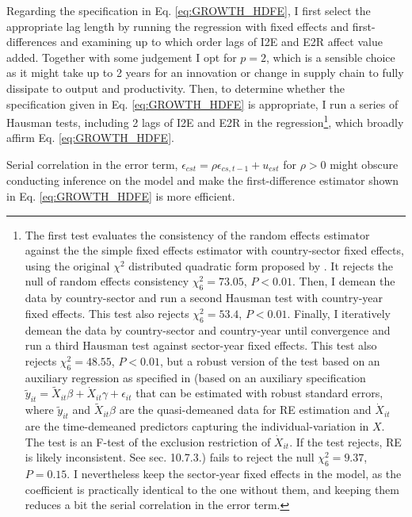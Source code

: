 \documentclass[a4paper]{article}
\begin{document}
Regarding the specification in Eq. \ref{eq:GROWTH_HDFE}, I first select the appropriate lag length by running the regression with fixed effects and first-differences and examining up to which order lags of I2E and E2R affect value added. Together with some judgement I opt for $p = 2$, which is a sensible choice as it might take up to 2 years for an innovation or change in supply chain to fully dissipate to output and productivity. Then, to determine whether the specification given in Eq. \ref{eq:GROWTH_HDFE} is appropriate, I run a series of Hausman tests, including 2 lags of I2E and E2R in the regression\footnote{The first test evaluates the consistency of the random effects estimator against the the  simple fixed effects estimator with country-sector fixed effects, using the original $\chi^2$ distributed quadratic form proposed by \citet{hausman1978specification}. It rejects the null of random effects consistency $\chi^2_6 = 73.05$, $P < 0.01$. Then, I demean the data by country-sector and run a second Hausman test with country-year fixed effects. This test also rejects $\chi^2_6 = 53.4$, $P < 0.01$. Finally, I iteratively demean the data by country-sector and country-year until convergence and run a third Hausman test against sector-year fixed effects. This test also rejects $\chi^2_6 = 48.55$, $P < 0.01$, but a robust version of the test based on an auxiliary regression as specified in \citet{wooldridge2010econometric} (based on an auxiliary specification $\tilde{y}_{it} = \tilde{X}_{it}\beta + \dot{X}_{it}\gamma + \epsilon_{it}$ that can be estimated with robust standard errors, where  $\tilde{y}_{it} $ and $\tilde{X}_{it}\beta$ are the quasi-demeaned data for RE estimation and $\dot{X}_{it}$ are the time-demeaned predictors capturing the individual-variation in $X$. The test is an F-test of the exclusion restriction of $\dot{X}_{it}$. If the test rejects, RE is likely inconsistent. See \citet{wooldridge2010econometric} sec. 10.7.3.) fails to reject the null $\chi^2_6 = 9.37$, $P = 0.15$. I nevertheless keep the sector-year fixed effects in the model, as the coefficient is practically identical to the one without them, and keeping them reduces a bit the serial correlation in the error term.}, which broadly affirm Eq. \ref{eq:GROWTH_HDFE}. 

Serial correlation in the error term, $\epsilon_{cst} = \rho \epsilon_{cs,t-1} + u_{cst}$ for $\rho > 0$ might obscure conducting inference on the model and make the first-difference estimator shown in Eq. \ref{eq:GROWTH_HDFE} is more efficient. 
\end{document}
